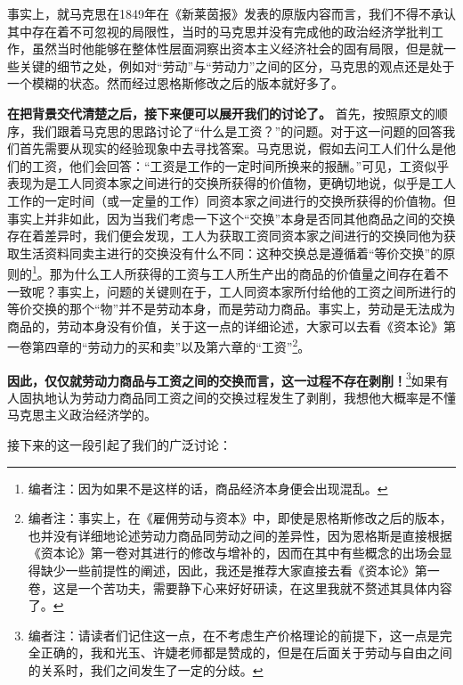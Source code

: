 \documentclass[a4paper,twoside,12pt,AutoFakeBold]{ctexart}
\begin{document}
事实上，就马克思在1849年在《新莱茵报》发表的原版内容而言，我们不得不承认其中存在着不可忽视的局限性，当时的马克思并没有完成他的政治经济学批判工作，虽然当时他能够在整体性层面洞察出资本主义经济社会的固有局限，但是就一些关键的细节之处，例如对“劳动”与“劳动力”之间的区分，马克思的观点还是处于一个模糊的状态。然而经过恩格斯修改之后的版本就好多了。

 \vspace{0.5cm} %
\textbf{在把背景交代清楚之后，接下来便可以展开我们的讨论了。}
首先，按照原文的顺序，我们跟着马克思的思路讨论了“什么是工资？”的问题。对于这一问题的回答我们首先需要从现实的经验现象中去寻找答案。马克思说，假如去问工人们什么是他们的工资，他们会回答：“工资是工作的一定时间所换来的报酬。”可见，工资似乎表现为是工人同资本家之间进行的交换所获得的价值物，更确切地说，似乎是工人工作的一定时间（或一定量的工作）同资本家之间进行的交换所获得的价值物。但事实上并非如此，因为当我们考虑一下这个“交换”本身是否同其他商品之间的交换存在着差异时，我们便会发现，工人为获取工资同资本家之间进行的交换同他为获取生活资料同卖主进行的交换没有什么不同：这种交换总是遵循着“等价交换”的原则的\footnote{编者注：因为如果不是这样的话，商品经济本身便会出现混乱。}。那为什么工人所获得的工资与工人所生产出的商品的价值量之间存在着不一致呢？事实上，问题的关键则在于，工人同资本家所付给他的工资之间所进行的等价交换的那个“物”并不是劳动本身，而是劳动力商品。事实上，劳动是无法成为商品的，劳动本身没有价值，关于这一点的详细论述，大家可以去看《资本论》第一卷第四章的“劳动力的买和卖”以及第六章的“工资”\footnote{编者注：事实上，在《雇佣劳动与资本》中，即使是恩格斯修改之后的版本，也并没有详细地论述劳动力商品同劳动之间的差异性，因为恩格斯是直接根据《资本论》第一卷对其进行的修改与增补的，因而在其中有些概念的出场会显得缺少一些前提性的阐述，因此，我还是推荐大家直接去看《资本论》第一卷，这是一个苦功夫，需要静下心来好好研读，在这里我就不赘述其具体内容了。}。

\textbf{因此，仅仅就劳动力商品与工资之间的交换而言，这一过程不存在剥削！}\footnote{编者注：请读者们记住这一点，在不考虑生产价格理论的前提下，这一点是完全正确的，我和光玉、许婕老师都是赞成的，但是在后面关于劳动与自由之间的关系时，我们之间发生了一定的分歧。}如果有人固执地认为劳动力商品同工资之间的交换过程发生了剥削，我想他大概率是不懂马克思主义政治经济学的。

接下来的这一段引起了我们的广泛讨论：
\end{document}
